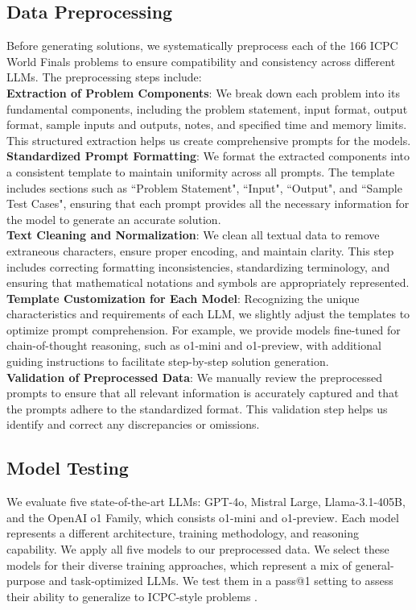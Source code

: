 \subsection{Data Preprocessing}
Before generating solutions, we systematically preprocess each of the 166 ICPC World Finals problems to ensure compatibility and consistency across different LLMs. The preprocessing steps include:\\
\textbf{Extraction of Problem Components}: We break down each problem into its fundamental components, including the problem statement, input format, output format, sample inputs and outputs, notes, and specified time and memory limits. This structured extraction helps us create comprehensive prompts for the models.\\
\textbf{Standardized Prompt Formatting}: We format the extracted components into a consistent template to maintain uniformity across all prompts. The template includes sections such as ``Problem Statement", ``Input", ``Output", and ``Sample Test Cases", ensuring that each prompt provides all the necessary information for the model to generate an accurate solution.\\
\textbf{Text Cleaning and Normalization}: We clean all textual data to remove extraneous characters, ensure proper encoding, and maintain clarity. This step includes correcting formatting inconsistencies, standardizing terminology, and ensuring that mathematical notations and symbols are appropriately represented.\\
\textbf{Template Customization for Each Model}: Recognizing the unique characteristics and requirements of each LLM, we slightly adjust the templates to optimize prompt comprehension. For example, we provide models fine-tuned for chain-of-thought reasoning, such as o1-mini and o1-preview, with additional guiding instructions to facilitate step-by-step solution generation.\\
\textbf{Validation of Preprocessed Data}: We manually review the preprocessed prompts to ensure that all relevant information is accurately captured and that the prompts adhere to the standardized format. This validation step helps us identify and correct any discrepancies or omissions.

\subsection{Model Testing}
We evaluate five state-of-the-art LLMs: GPT-4o, Mistral Large, Llama-3.1-405B, and the OpenAI o1 Family, which consists o1-mini and o1-preview. Each model represents a different architecture, training methodology, and reasoning capability. We apply all five models to our preprocessed data. We select these models for their diverse training approaches, which represent a mix of general-purpose and task-optimized LLMs. We test them in a pass@1 setting to assess their ability to generalize to ICPC-style problems \cite{b1,b2}.

